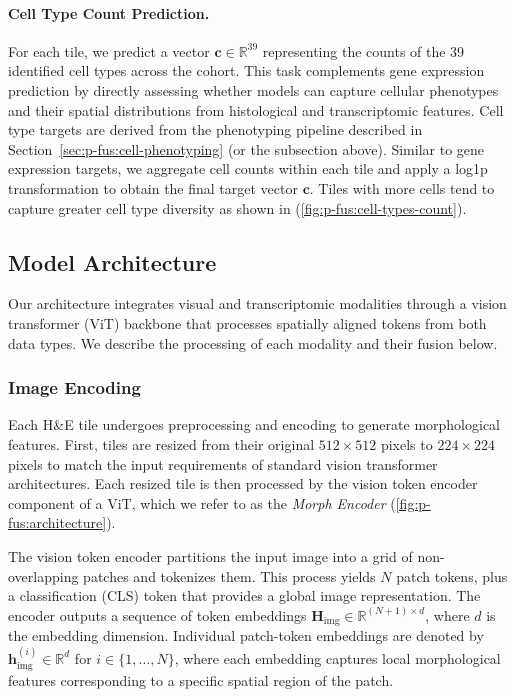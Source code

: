 \paragraph{Cell Type Count Prediction.}
For each tile, we predict a vector $\mathbf{c}\in\mathbb{R}^{39}$ representing the counts of the 39 identified cell types across the cohort. This task complements gene expression prediction by directly assessing whether models can capture cellular phenotypes and their spatial distributions from histological and transcriptomic features. Cell type targets are derived from the phenotyping pipeline described in Section~\ref{sec:p-fus:cell-phenotyping} (or the subsection above). Similar to gene expression targets, we aggregate cell counts within each tile and apply a log1p transformation to obtain the final target vector $\mathbf{c}$. Tiles with more cells tend to capture greater cell type diversity as shown in (\autoref{fig:p-fus:cell-types-count}).


\subsection*{Model Architecture}
\label{sec:model-architecture}

Our architecture integrates visual and transcriptomic modalities through a vision transformer (ViT) backbone that processes spatially aligned tokens from both data types. We describe the processing of each modality and their fusion below.

\subsubsection{Image Encoding}
\label{sec:image-encoding}

Each H\&E tile undergoes preprocessing and encoding to generate morphological features. First, tiles are resized from their original $512\times512$ pixels to $224\times224$ pixels to match the input requirements of standard vision transformer architectures. Each resized tile is then processed by the vision token encoder component of a ViT, which we refer to as the \emph{Morph Encoder} (\autoref{fig:p-fus:architecture}).

The vision token encoder partitions the input image into a grid of non-overlapping patches and tokenizes them. This process yields $N$ patch tokens, plus a classification (CLS) token that provides a global image representation. The encoder outputs a sequence of token embeddings $\mathbf{H}_{\text{img}}\in\mathbb{R}^{(N+1)\times d}$, where $d$ is the embedding dimension. Individual patch-token embeddings are denoted by $\mathbf{h}_{\text{img}}^{(i)}\in\mathbb{R}^{d}$ for $i\in\{1,\dots,N\}$, where each embedding captures local morphological features corresponding to a specific spatial region of the patch.

